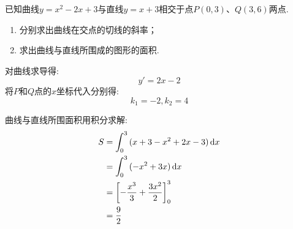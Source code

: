 \begin{questions}
	\question 已知曲线$y=x^2-2x+3$与直线$y=x+3$相交于点$P(0,3)$、$Q(3,6)$两点.
	\begin{enumerate}[label=(\arabic*)]
		\item 分别求出曲线在交点的切线的斜率；
		\item 求出曲线与直线所围成的图形的面积.
	\end{enumerate}
	\begin{solution}
		\begin{center}
		\end{center}
		对曲线求导得:
		\begin{equation*}
			y' = 2x - 2
		\end{equation*}
		将$P$和$Q$点的$x$坐标代入分别得:
		\begin{equation*}
			k_1 = -2, k_2 = 4
		\end{equation*}

		曲线与直线所围面积用积分求解:
		\begin{align*}
			S & = \int_0^3{(x + 3 - x^2 + 2x - 3)}\mathop{}\!\mathrm{d}x      \\
			  & = \int_0^3{(-x^2 + 3x)}\mathop{}\!\mathrm{d}x                 \\
			  & = \left[-\frac{x^3}{3} + \frac{3x^2}{2}\right]_0^3 \\
			  & = \frac92
		\end{align*}
	\end{solution}

\end{questions}
